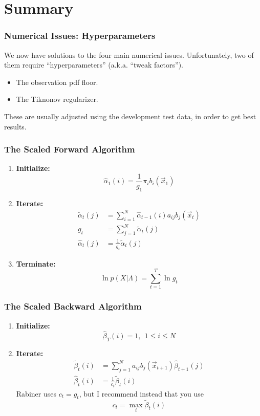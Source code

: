 \documentclass{beamer}
\begin{document}
\section[Summary]{Summary}
\setcounter{subsection}{1}

\begin{frame}
  \frametitle{Numerical Issues: Hyperparameters}

  We now have solutions to the four main numerical issues.
  Unfortunately, two of them require ``hyperparameters''
  (a.k.a. ``tweak factors'').
  \begin{itemize}
  \item The observation pdf floor.
  \item The Tiknonov regularizer.
  \end{itemize}
  These are usually adjusted using the development test data, in order
  to get best results.
\end{frame}

\begin{frame}
  \frametitle{The Scaled Forward Algorithm}

  \begin{enumerate}
  \item {\bf Initialize:}
    \[
    \hat\alpha_1(i) = \frac{1}{g_1}\pi_i b_i(\vec{x}_1)
    \]
  \item {\bf Iterate:}
    \begin{align*}
      \tilde\alpha_{t}(j) &= \sum_{i=1}^N \hat\alpha_{t-1}(i) a_{ij}b_j(\vec{x}_t)\\
      g_t &= \sum_{j=1}^N \tilde\alpha_t(j)\\
      \hat\alpha_{t}(j) &= \frac{1}{g_t}\tilde\alpha_t(j)
    \end{align*}
  \item {\bf Terminate:}
    \[
    \ln p(X|\Lambda) = \sum_{t=1}^T \ln g_t
    \]
  \end{enumerate}
\end{frame}

\begin{frame}
  \frametitle{The Scaled Backward Algorithm}

  \begin{enumerate}
  \item {\bf Initialize:}
    \[
    \hat\beta_T(i) = 1,~~1\le i\le N
    \]
  \item {\bf Iterate:}
    \begin{align*}
      \tilde\beta_{t}(i) &= \sum_{j=1}^N a_{ij}b_j(\vec{x}_{t+1})\hat\beta_{t+1}(j)\\
      \hat\beta_t(i) &= \frac{1}{c_t}\tilde\beta_t(i)
    \end{align*}
    Rabiner uses $c_t=g_t$, but I recommend instead that you use
    \begin{displaymath}
      c_t = \max_i\tilde\beta_t(i)
    \end{displaymath}
  \end{enumerate}
\end{frame}
\end{document}
